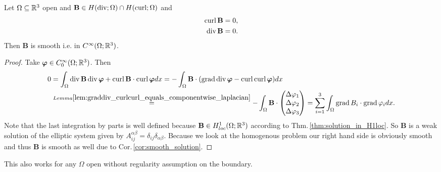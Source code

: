 \documentclass[../master_thesis.tex]{subfiles}
\begin{document}
\begin{theorem}\label{thm:smoothness_of_solutions}
    Let $\Omega \subseteq \mathbb{R}^3$ open and 
    $\mathbf{B} \in H(\operatorname{div};\Omega) \cap H(\operatorname{curl};\Omega)$ and 
    \begin{align*}
        \operatorname{curl} \mathbf{B} &= 0,
        \\ \operatorname{div} \mathbf{B} &= 0.
    \end{align*}
    Then $\mathbf{B}$ is smooth i.e. in $C^\infty(\Omega;\mathbb{R}^3)$.
\end{theorem}
\begin{proof}
    Take $\bm{\varphi} \in C_0^\infty(\Omega;\mathbb{R}^3)$. Then 
    \begin{align*}
        0 &= \int_\Omega \operatorname{div} \mathbf{B} \operatorname{div} \bm{\varphi} + \operatorname{curl} \mathbf{B} \cdot \operatorname{curl} \bm{\varphi} dx
        = - \int_\Omega \mathbf{B} \cdot (\operatorname{grad} \operatorname{div} \bm{\varphi} - \operatorname{curl} \operatorname{curl} \bm{\varphi}) dx
        \\ &\stackrel{Lemma 
            \ref{lem:graddiv_curlcurl_equals_componentwise_laplacian}}{=} 
            - \int_\Omega \mathbf{B} \cdot 
            \begin{pmatrix}
                \Delta \varphi_1 \\ \Delta \varphi_2 \\ \Delta \varphi_3
            \end{pmatrix}
        = \sum\limits_{i=1}^3 \int_\Omega \operatorname{grad} B_i \cdot \operatorname{grad} \varphi_i dx.
    \end{align*}
    Note that the last integration by parts is well defined because 
    $\mathbf{B} \in H^1_{loc}(\Omega;\mathbb{R}^3)$ according to Thm.\,\ref{thm:solution_in_H1loc}. 
    So $\mathbf{B}$ is a weak solution 
    of the elliptic system given by 
    $A_{ij}^{\alpha \beta} = \delta_{ij} \delta_{\alpha\beta}$. Because 
    we look at the homogenous problem our right hand side is obviously smooth 
    and thus $\mathbf{B}$ is smooth as well due to Cor.\,\ref{cor:smooth_solution}.
\end{proof}

\begin{remark}
    This also works for any $\Omega$ open without regularity assumption on the boundary.
\end{remark}

\end{document}
